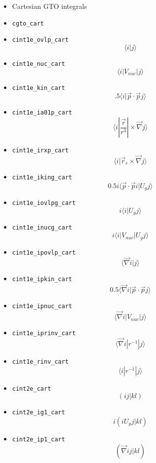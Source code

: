 \documentclass{article}
\begin{document}
\begin{itemize}
\item
  Cartesian GTO integrals
\item
  \verb!cgto_cart!\\
\item
  \verb!cint1e_ovlp_cart! \[\langle i| j\rangle \]
\item
  \verb!cint1e_nuc_cart! \[\langle i| V_{nuc} | j\rangle \]
\item
  \verb!cint1e_kin_cart!
  \[.5\langle i| \vec{p} \cdot \vec{p} j\rangle \]
\item
  \verb!cint1e_ia01p_cart!
  \[\langle i| \frac{\vec{r}}{r^3}| \times \vec{\nabla} j\rangle \]
\item
  \verb!cint1e_irxp_cart!
  \[\langle i| \vec{r}_c \times \vec{\nabla} j\rangle \]
\item
  \verb!cint1e_iking_cart!
  \[0.5i\langle \vec{p} \cdot \vec{p} i| U_gj\rangle \]
\item
  \verb!cint1e_iovlpg_cart! \[i \langle i| U_gj\rangle \]
\item
  \verb!cint1e_inucg_cart! \[i \langle i| V_{nuc}| U_gj\rangle \]
\item
  \verb!cint1e_ipovlp_cart! \[\langle \vec{\nabla} i|j\rangle \]
\item
  \verb!cint1e_ipkin_cart!
  \[0.5\langle \vec{\nabla} i| \vec{p} \cdot \vec{p} j\rangle \]
\item
  \verb!cint1e_ipnuc_cart!
  \[\langle \vec{\nabla} i| V_{nuc}|j\rangle \]
\item
  \verb!cint1e_iprinv_cart!
  \[\langle \vec{\nabla} i| r^{-1}|j\rangle \]
\item
  \verb!cint1e_rinv_cart! \[\langle i| r^{-1} |j\rangle \]
\item
  \verb!cint2e_cart! \[(ij|kl)\]
\item
  \verb!cint2e_ig1_cart! \[i(i U_g j|kl)\]
\item
  \verb!cint2e_ip1_cart! \[(\vec{\nabla} i j|kl)\]


\end{itemize}
\end{document}

